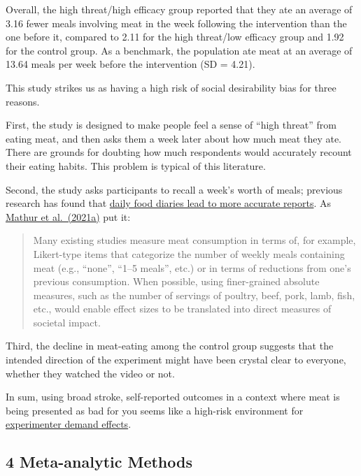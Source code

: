 \documentclass[
  man]{apa6}
\begin{document}
Overall, the high threat/high efficacy group reported that they ate an average of 3.16 fewer meals involving meat in the week following the intervention than the one before it, compared to 2.11 for the high threat/low efficacy group and 1.92 for the control group. As a benchmark, the population ate meat at an average of 13.64 meals per week before the intervention (SD = 4.21).

This study strikes us as having a high risk of social desirability bias for three reasons.

First, the study is designed to make people feel a sense of ``high threat'' from eating meat, and then asks them a week later about how much meat they ate. There are grounds for doubting how much respondents would accurately recount their eating habits. This problem is typical of this literature.

Second, the study asks participants to recall a week's worth of meals; previous research has found that \href{https://pubmed.ncbi.nlm.nih.gov/7635601/}{daily food diaries lead to more accurate reports}. As \href{https://www.sciencedirect.com/science/article/pii/S0195666321001847}{Mathur et al.~(2021a)} put it:

\begin{quote}
Many existing studies measure meat consumption in terms of, for example, Likert-type items that categorize the number of weekly meals containing meat (e.g., ``none'', ``1--5 meals'', etc.) or in terms of reductions from one's previous consumption. When possible, using finer-grained absolute measures, such as the number of servings of poultry, beef, pork, lamb, fish, etc., would enable effect sizes to be translated into direct measures of societal impact.
\end{quote}

Third, the decline in meat-eating among the control group suggests that the intended direction of the experiment might have been crystal clear to everyone, whether they watched the video or not.

In sum, using broad stroke, self-reported outcomes in a context where meat is being presented as bad for you seems like a high-risk environment for \href{https://www.elgaronline.com/display/edcoll/9781788110556/9781788110556.00031.xml}{experimenter demand effects}.

\subsection{4 Meta-analytic Methods}\label{meta-analytic-methods}
\end{document}
